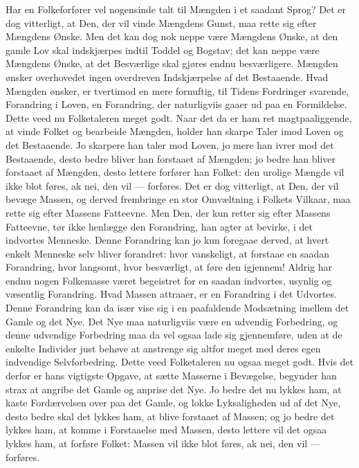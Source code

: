 \documentclass[12pt,a4paper]{book}
\begin{document}
Har en Folkeforfører vel nogensinde talt til Mængden i et saadant Sprog? Det er dog
vitterligt, at Den, der vil vinde Mængdens Gunst, maa rette sig efter Mængdens Ønske.
Men det kan dog nok neppe være Mængdens Ønske, at den gamle Lov skal indskjærpes indtil
Toddel og Bogstav; det kan neppe være Mængdens Ønske, at det Besværlige skal gjøres
endnu besværligere. Mængden ønsker overhovedet ingen overdreven Indskjærpelse af det
Bestaaende. Hvad Mængden ønsker, er tvertimod en mere fornuftig, til Tidens Fordringer
svarende, Forandring i Loven, en Forandring, der naturligviis gaaer ud paa en
Formildelse. Dette veed nu Folketaleren meget godt. Naar det da er ham ret
magtpaaliggende, at vinde Folket og bearbeide Mængden, holder han skarpe Taler imod
Loven og det Bestaaende. Jo skarpere han taler mod Loven, jo mere han ivrer mod det
Bestaaende, desto bedre bliver han forstaaet af Mængden; jo bedre han bliver forstaaet
af Mængden, desto lettere forfører han Folket: den urolige Mængde vil ikke blot føres,
ak nei, den vil --- forføres. Det er dog vitterligt, at Den, der vil bevæge Massen, og
derved frembringe en stor Omvæltning i Folkets Vilkaar, maa rette sig efter Massens
Fatteevne. Men Den, der kun retter sig efter Massens Fatteevne, tør ikke henlægge den
Forandring, han agter at bevirke, i det indvortes Menneske. Denne Forandring kan jo kun
foregaae derved, at hvert enkelt Menneske selv bliver forandret: hvor vanskeligt, at
forstaae en saadan Forandring, hvor langsomt, hvor besværligt, at føre den igjennem!
Aldrig har endnu nogen Folkemasse været begeistret for en saadan indvortes, usynlig og
væsentlig Forandring. Hvad Massen attraaer, er en Forandring i det Udvortes. Denne
Forandring kan da især vise sig i en paafaldende Modsætning imellem det Gamle
og det Nye. Det Nye maa naturligviis være en udvendig Forbedring, og denne udvendige
Forbedring maa da vel ogsaa lade sig gjennemføre, uden at de enkelte Individer just
behøve at anstrenge sig altfor meget med deres egen indvendige Selvforbedring. Dette
veed Folketaleren nu ogsaa meget godt. Hvis det derfor er hans vigtigste Opgave, at
sætte Masserne i Bevægelse, begynder han strax at angribe det Gamle og anprise det Nye.
Jo bedre det nu lykkes ham, at kaste Fordærvelsen over paa det Gamle, og lokke
Lyksaligheden ud af det Nye, desto bedre skal det lykkes ham, at blive forstaaet af
Massen; og jo bedre det lykkes ham, at komme i Forstaaelse med Massen, desto lettere
vil det ogsaa lykkes ham, at forføre Folket: Massen vil ikke blot føres, ak nei, den
vil --- forføres.
\end{document}
